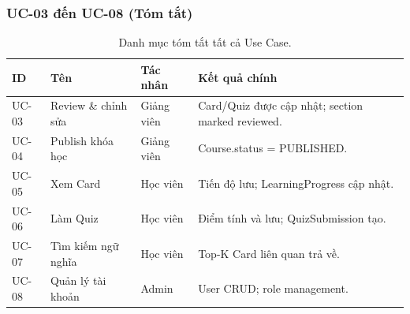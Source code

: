 \subsubsection*{UC-03 đến UC-08 (Tóm tắt)}

\begin{table}[H]
    \centering
    \caption*{Danh mục tóm tắt tất cả Use Case.}
    \begin{tabular}{p{1.5cm}p{4.5cm}p{3cm}p{5.5cm}}
        \toprule
        \textbf{ID} & \textbf{Tên} & \textbf{Tác nhân} & \textbf{Kết quả chính} \\
        \midrule
        UC-03 & Review \& chỉnh sửa   & Giảng viên   & Card/Quiz được cập nhật; section marked reviewed. \\
        UC-04 & Publish khóa học      & Giảng viên   & Course.status = PUBLISHED. \\
        UC-05 & Xem Card              & Học viên     & Tiến độ lưu; LearningProgress cập nhật. \\
        UC-06 & Làm Quiz              & Học viên     & Điểm tính và lưu; QuizSubmission tạo. \\
        UC-07 & Tìm kiếm ngữ nghĩa    & Học viên     & Top-K Card liên quan trả về. \\
        UC-08 & Quản lý tài khoản     & Admin        & User CRUD; role management. \\
        \bottomrule
    \end{tabular}
\end{table}
